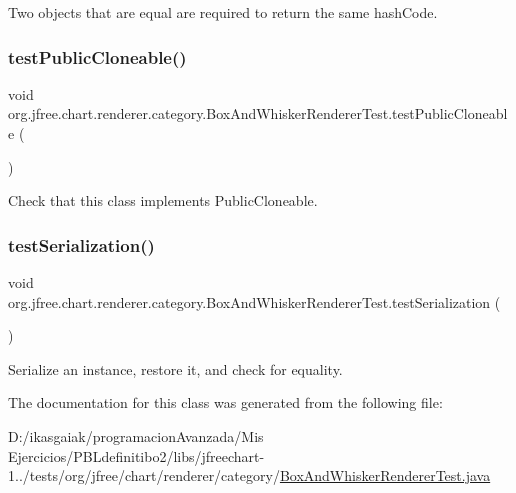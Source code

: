 Two objects that are equal are required to return the same hash\+Code. \mbox{\label{classorg_1_1jfree_1_1chart_1_1renderer_1_1category_1_1_box_and_whisker_renderer_test_a05d6165881a9933e2f3bd898b5de9524}} 
\subsubsection{\texorpdfstring{test\+Public\+Cloneable()}{testPublicCloneable()}}
{\footnotesize\ttfamily void org.\+jfree.\+chart.\+renderer.\+category.\+Box\+And\+Whisker\+Renderer\+Test.\+test\+Public\+Cloneable (\begin{DoxyParamCaption}{ }\end{DoxyParamCaption})}

Check that this class implements Public\+Cloneable. \mbox{\label{classorg_1_1jfree_1_1chart_1_1renderer_1_1category_1_1_box_and_whisker_renderer_test_a0957cac604a45b57d710ecc4ac5643f5}} 
\subsubsection{\texorpdfstring{test\+Serialization()}{testSerialization()}}
{\footnotesize\ttfamily void org.\+jfree.\+chart.\+renderer.\+category.\+Box\+And\+Whisker\+Renderer\+Test.\+test\+Serialization (\begin{DoxyParamCaption}{ }\end{DoxyParamCaption})}

Serialize an instance, restore it, and check for equality. 

The documentation for this class was generated from the following file\+:\begin{DoxyCompactItemize}
\item 
D\+:/ikasgaiak/programacion\+Avanzada/\+Mis Ejercicios/\+P\+B\+Ldefinitibo2/libs/jfreechart-\/1../tests/org/jfree/chart/renderer/category/\mbox{\hyperlink{_box_and_whisker_renderer_test_8java}{Box\+And\+Whisker\+Renderer\+Test.\+java}}\end{DoxyCompactItemize}
